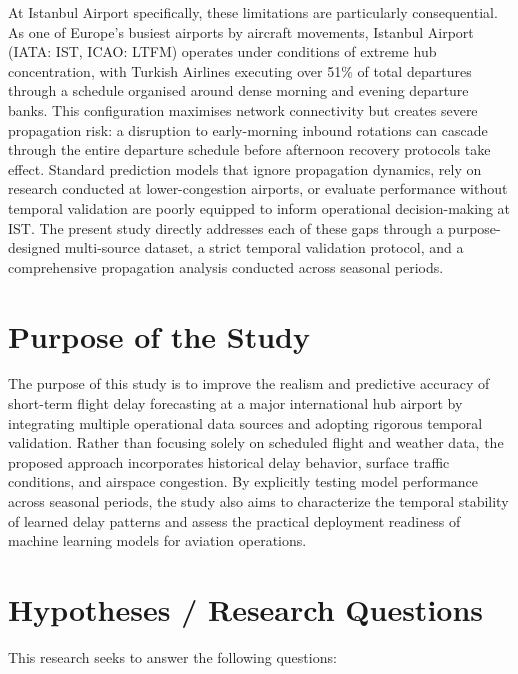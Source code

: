 \documentclass{report}
\begin{document}
At Istanbul Airport specifically, these limitations are particularly consequential. 
As one of Europe's busiest airports by aircraft movements, Istanbul Airport (IATA: 
IST, ICAO: LTFM) operates under conditions of extreme hub concentration, with Turkish 
Airlines executing over 51\% of total departures through a schedule organised around 
dense morning and evening departure banks. This configuration maximises network 
connectivity but creates severe propagation risk: a disruption to early-morning 
inbound rotations can cascade through the entire departure schedule before afternoon 
recovery protocols take effect. Standard prediction models that ignore propagation 
dynamics, rely on research conducted at lower-congestion airports, or evaluate 
performance without temporal validation are poorly equipped to inform operational 
decision-making at IST. The present study directly addresses each of these gaps 
through a purpose-designed multi-source dataset, a strict temporal validation 
protocol, and a comprehensive propagation analysis conducted across seasonal periods.

\section{Purpose of the Study}

The purpose of this study is to improve the realism and predictive accuracy of short-term flight delay forecasting at a major international hub airport by integrating multiple operational data sources and adopting rigorous temporal validation. Rather than focusing solely on scheduled flight and weather data, the proposed approach incorporates historical delay behavior, surface traffic conditions, and airspace congestion. By explicitly testing model performance across seasonal periods, the study also aims to characterize the temporal stability of learned delay patterns and assess the practical deployment readiness of machine learning models for aviation operations.

\section{Hypotheses / Research Questions}

This research seeks to answer the following questions:
\end{document}
